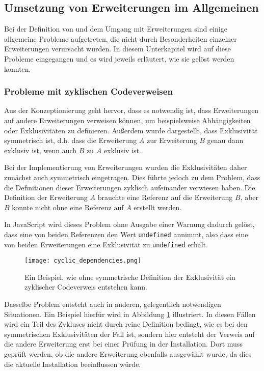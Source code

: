 \subsection{Umsetzung von Erweiterungen im Allgemeinen}
Bei der Definition von und dem Umgang mit Erweiterungen sind einige allgemeine Probleme aufgetreten, die nicht durch Besonderheiten einzelner Erweiterungen verursacht wurden. In diesem Unterkapitel wird auf diese Probleme eingegangen und es wird jeweils erläutert, wie sie gelöst werden konnten.

\subsubsection{Probleme mit zyklischen Codeverweisen}
Aus der Konzeptionierung geht hervor, dass es notwendig ist, dass Erweiterungen auf andere Erweiterungen verweisen können, um beispielsweise Abhängigkeiten oder Exklusivitäten zu definieren. Außerdem wurde dargestellt, dass Exklusivität symmetrisch ist, d.h. dass die Erweiterung $A$ zur Erweiterung $B$ genau dann exklusiv ist, wenn auch $B$ zu $A$ exklusiv ist.

Bei der Implementierung von Erweiterungen wurden die Exklusivitäten daher zunächst auch symmetrisch eingetragen. Dies führte jedoch zu dem Problem, dass die Definitionen dieser Erweiterungen zyklisch aufeinander verwiesen haben. Die Definition der Erweiterung $A$ brauchte eine Referenz auf die Erweiterung $B$, aber $B$ konnte nicht ohne eine Referenz auf $A$ erstellt werden.

In JavaScript wird dieses Problem ohne Ausgabe einer Warnung dadurch gelöst, dass eine von beiden Referenzen den Wert \verb|undefined| annimmt, also dass eine von beiden Erweiterungen eine Exklusivität zu \verb|undefined| erhält.

  \begin{figure}
	\centering
		\texttt{[image: cyclic\_dependencies.png]}
      	\caption{Ein Beispiel, wie ohne symmetrische Definition der Exklusivität ein zyklischer Codeverweis entstehen kann.}
		\label{fig:impl:dependency_installation_import_issue_example}
  \end{figure}

Dasselbe Problem entsteht auch in anderen, gelegentlich notwendigen Situationen. Ein Beispiel hierfür wird in Abbildung \ref{fig:impl:dependency_installation_import_issue_example} illustriert. In diesen Fällen wird ein Teil des Zykluses nicht durch reine Definition bedingt, wie es bei den symmetrischen Exklusivitäten der Fall ist, sondern hier entsteht der Verweis auf die andere Erweiterung erst bei einer Prüfung in der Installation. Dort muss geprüft werden, ob die andere Erweiterung ebenfalls ausgewählt wurde, da dies die aktuelle Installation beeinflussen würde.

